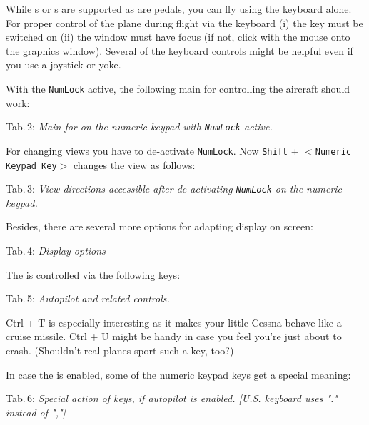 While s or s are supported as are 
pedals, you can fly \FlightGear{} using the keyboard alone. For proper control 
of the plane during flight via the keyboard (i) the \texttt{} 
key must be switched on (ii) the \FlightGear{} window must have focus (if not, 
click with the mouse onto the graphics window). Several of the keyboard 
controls might be helpful even if you use a joystick or yoke.

With the \texttt{NumLock} active, the following main 
for controlling the aircraft should work:
 \eject

\noindent
 Tab.\,2: \textit{Main  for \FlightGear{} on the
 numeric keypad with \texttt{NumLock} active.}
\medskip

\centerline{}
\vskip 5mm

For changing views you have to de-activate \texttt{NumLock}. Now \texttt{Shift}
+
$<$\texttt{Numeric Keypad Key}$>$ changes the view as follows:
\medskip

\noindent
 Tab.\,3: \textit{View directions
accessible after de-activating \texttt{NumLock} on the numeric keypad.}
\medskip

\centerline{}
\vskip 5mm
Besides, there are several more options for adapting display on screen:
\vfill
\eject

\noindent
 Tab.\,4: \textit{Display options}
\medskip

\centerline{}
\vskip 5mm

The  is controlled via the following keys:
\medskip

\noindent
 Tab.\,5: \textit{Autopilot and related controls.}
\medskip

\centerline{}
\medskip

\noindent Ctrl + T is especially interesting as it makes your little Cessna
behave
like a cruise missile. Ctrl + U might be handy in case you feel you're just
about to
crash. (Shouldn't real planes sport such a key, too?)

In case the  is enabled, some of the numeric keypad keys get a
special
meaning:

\noindent
 Tab.\,6: \textit{Special action of keys, if autopilot is
 enabled. [U.S. keyboard uses "." instead of ","]}
\medskip

